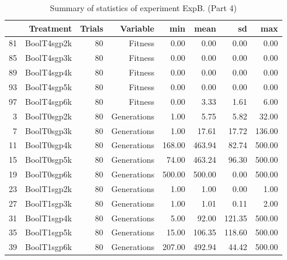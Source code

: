 \begin{table}[ht]
\centering
\begin{tabular}{rrrrrrrr}
  \hline
 & Treatment & Trials & Variable & min & mean & sd & max \\ 
  \hline
81 & BoolT4sgp2k &  80 & Fitness & 0.00 & 0.00 & 0.00 & 0.00 \\ 
  85 & BoolT4sgp3k &  80 & Fitness & 0.00 & 0.00 & 0.00 & 0.00 \\ 
  89 & BoolT4sgp4k &  80 & Fitness & 0.00 & 0.00 & 0.00 & 0.00 \\ 
  93 & BoolT4sgp5k &  80 & Fitness & 0.00 & 0.00 & 0.00 & 0.00 \\ 
  97 & BoolT4sgp6k &  80 & Fitness & 0.00 & 3.33 & 1.61 & 6.00 \\ 
  3 & BoolT0sgp2k &  80 & Generations & 1.00 & 5.75 & 5.82 & 32.00 \\ 
  7 & BoolT0sgp3k &  80 & Generations & 1.00 & 17.61 & 17.72 & 136.00 \\ 
  11 & BoolT0sgp4k &  80 & Generations & 168.00 & 463.94 & 82.74 & 500.00 \\ 
  15 & BoolT0sgp5k &  80 & Generations & 74.00 & 463.24 & 96.30 & 500.00 \\ 
  19 & BoolT0sgp6k &  80 & Generations & 500.00 & 500.00 & 0.00 & 500.00 \\ 
  23 & BoolT1sgp2k &  80 & Generations & 1.00 & 1.00 & 0.00 & 1.00 \\ 
  27 & BoolT1sgp3k &  80 & Generations & 1.00 & 1.01 & 0.11 & 2.00 \\ 
  31 & BoolT1sgp4k &  80 & Generations & 5.00 & 92.00 & 121.35 & 500.00 \\ 
  35 & BoolT1sgp5k &  80 & Generations & 15.00 & 106.35 & 118.60 & 500.00 \\ 
  39 & BoolT1sgp6k &  80 & Generations & 207.00 & 492.94 & 44.42 & 500.00 \\ 
   \hline
\end{tabular}
\caption{Summary of statistics of experiment ExpB. (Part 4)} 
\end{table}
